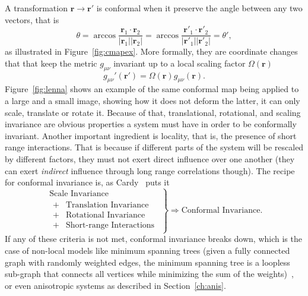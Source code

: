 A transformation $\mathbf{r}\rightarrow\mathbf{r}'$ is conformal when it
preserve the angle between any two vectors, that is
\begin{equation}
    \theta=
    \arccos\frac{\mathbf{r}_{1}\cdot\mathbf{r}_{2}}
                {\left|\mathbf{r}_{1}\right|\left|\mathbf{r}_{2}\right|}=
    \arccos\frac{\mathbf{r}'_{1}\cdot\mathbf{r}'_{2}}
                {\left|\mathbf{r}'_{1}\right|\left|\mathbf{r}'_{2}\right|}=
    \theta',
\end{equation}
as illustrated in Figure~\ref{fig:cmapex}. More formally, they are coordinate
changes that that keep the metric $g_{\mu\nu}$ invariant up to a local scaling
factor $\Omega(\mathbf{r})$
\begin{equation}
    g_{\mu\nu}'\left(\mathbf{r}'\right)=
    \Omega\left(\mathbf{r}\right)g_{\mu\nu}\left(\mathbf{r}\right).
\end{equation}
Figure~\ref{fig:lenna} shows an example of the same conformal map being applied
to a large and a small image, showing how it does not deform the latter, it can
only scale, translate or rotate it. Because of that, translational, rotational,
and scaling invariance are obvious properties a system must have in order to be
conformally invariant. Another important ingredient is locality, that is, the
presence of short range interactions. That is because if different parts of the
system will be rescaled by different factors, they must not exert direct
influence over one another (they can exert \textit{indirect} influence through
long range correlations though). The recipe for conformal invariance is, as
Cardy~\cite{Domb1972} puts it
\begin{equation*}
    \left.
        \begin{array}{l}
            \mbox{Scale Invariance}\\
            \begin{array}{cl}
                + & \mbox{Translation Invariance}\\
                + & \mbox{Rotational Invariance}\\
                + & \mbox{Short-range Interactions}
            \end{array}
        \end{array}
    \right\} \Rightarrow\mbox{Conformal Invariance}.
\end{equation*}
If any of these criteria is not met, conformal invariance breaks down, which is
the case of non-local models like minimum spanning trees (given a fully
connected graph with randomly weighted edges, the minimum spanning tree is a
loopless sub-graph that connects all vertices while minimizing the sum of the
weights)~\cite{Wilson2004}, or even anisotropic systems as described in
Section~\ref{ch:anis}.

